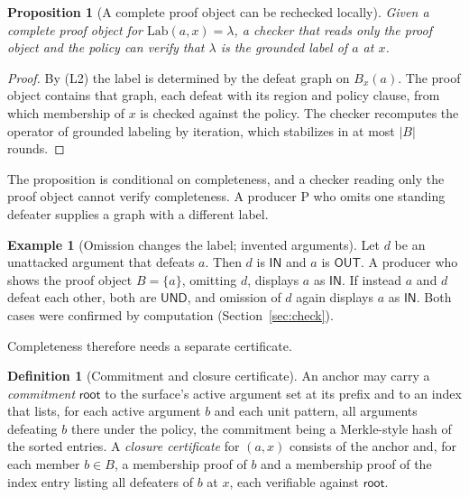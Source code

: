 \documentclass[11pt]{article}
\theoremstyle{plain}
\newtheorem{proposition}[theorem]{Proposition}
\theoremstyle{definition}
\newtheorem{definition}[theorem]{Definition}
\newtheorem{example}[theorem]{Example}
\theoremstyle{remark}
\newcommand{\IN}{\textsf{IN}}
\newcommand{\OUT}{\textsf{OUT}}
\newcommand{\UND}{\textsf{UND}}
\newcommand{\Lab}{\mathrm{Lab}}
\begin{document}
\begin{proposition}[A complete proof object can be rechecked locally]\label{prop:proofcheck}
Given a complete proof object for $\Lab(a,x)=\lambda$, a checker that reads only the proof object and the policy can verify that $\lambda$ is the grounded label of $a$ at $x$.
\end{proposition}

\begin{proof}
By (L2) the label is determined by the defeat graph on $B_x(a)$. The proof object contains that graph, each defeat with its region and policy clause, from which membership of $x$ is checked against the policy. The checker recomputes the operator of grounded labeling by iteration, which stabilizes in at most $|B|$ rounds.
\end{proof}

The proposition is conditional on completeness, and a checker reading only the proof object cannot verify completeness. A producer P who omits one standing defeater supplies a graph with a different label.

\begin{example}[Omission changes the label; invented arguments]\label{ex:omit}
Let $d$ be an unattacked argument that defeats $a$. Then $d$ is $\IN$ and $a$ is $\OUT$. A producer who shows the proof object $B=\{a\}$, omitting $d$, displays $a$ as $\IN$. If instead $a$ and $d$ defeat each other, both are $\UND$, and omission of $d$ again displays $a$ as $\IN$. Both cases were confirmed by computation (Section~\ref{sec:check}).
\end{example}

Completeness therefore needs a separate certificate.

\begin{definition}[Commitment and closure certificate]\label{def:closurecert}
An anchor may carry a \emph{commitment} $\mathsf{root}$ to the surface's active argument set at its prefix and to an index that lists, for each active argument $b$ and each unit pattern, all arguments defeating $b$ there under the policy, the commitment being a Merkle-style hash of the sorted entries. A \emph{closure certificate} for $(a,x)$ consists of the anchor and, for each member $b\in B$, a membership proof of $b$ and a membership proof of the index entry listing all defeaters of $b$ at $x$, each verifiable against $\mathsf{root}$.
\end{definition}
\end{document}
